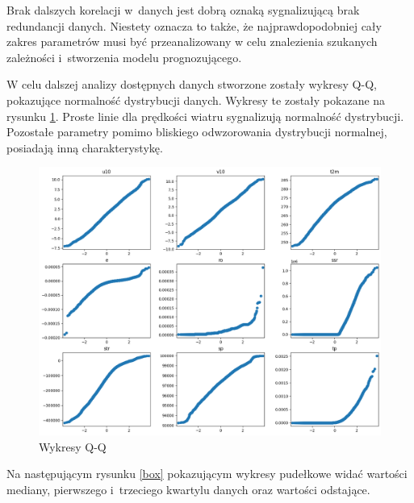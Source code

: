Brak dalszych korelacji w~danych jest dobrą oznaką sygnalizującą brak redundancji danych.
Niestety oznacza to także, że najprawdopodobniej cały zakres parametrów musi być przeanalizowany
w celu znalezienia szukanych zależności i~stworzenia modelu prognozującego. 

W celu dalszej analizy dostępnych danych stworzone zostały wykresy Q-Q, pokazujące normalność
dystrybucji danych. Wykresy te zostały pokazane na rysunku \ref{qq}. Proste linie dla prędkości 
wiatru sygnalizują normalność dystrybucji. Pozostałe parametry pomimo bliskiego odwzorowania
dystrybucji normalnej, posiadają inną charakterystykę. 


\begin{figure}[H]
    \centering
    \includegraphics[width=\textwidth]{images/qq.png}
    \caption[Wykresy Q-Q]{Wykresy Q-Q}
    \label{qq}
\end{figure}

Na następującym rysunku \ref{box} pokazującym wykresy pudełkowe widać wartości mediany, pierwszego i~trzeciego
kwartylu danych oraz wartości odstające. 

